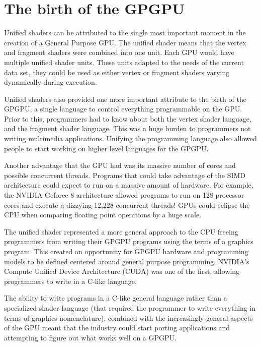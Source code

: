 \section*{The birth of the GPGPU}

Unified shaders can be attributed to the single most important moment in the creation of a General Purpose GPU. The unified shader means that the vertex and fragment shaders were combined into one unit. Each GPU would have multiple unified shader units. These units adapted to the needs of the current data set, they could be used as either vertex or fragment shaders varying dynamically during execution. 

Unified shaders also provided one more important attribute to the birth of the GPGPU, a single language to control everything programmable on the GPU. Prior to this, programmers had to know about both the vertex shader language, and the fragment shader language. This was a huge burden to programmers not writing multimedia applications. Unifying the programming language also allowed people to start working on higher level languages for the GPGPU. \cite{gpucomputing}

Another advantage that the GPU had was its massive number of cores and possible concurrent threads.  Programs that could take advantage of the SIMD architecture could expect to run on a massive amount of hardware. For example, the NVIDIA Geforce 8 architecture allowed programs to run on 128 processor cores and execute a dizzying 12,228 concurrent threads! GPUs could eclipse the CPU when comparing floating point operations by a huge scale. \cite{emergingtech}

The unified shader represented a more general approach to the CPU freeing programmers from writing their GPGPU programs using the terms of a graphics program. This created an opportunity for GPGPU hardware and programming models to be defined centered around general purpose programming. NVIDIA's Compute Unified Device Architecture (CUDA) was one of the first, allowing programmers to write in a C-like language. 

The ability to write programs in a C-like general language rather than a specialized shader language (that required the programmer to write everything in terms of graphics nomenclature), combined with the increasingly general aspects of the GPU meant that the industry could start porting applications and attempting to figure out what works well on a GPGPU. 

